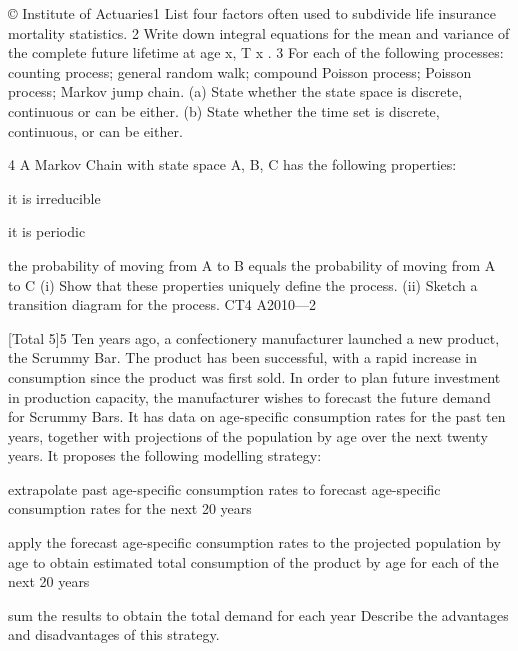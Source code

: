 © Institute of Actuaries1 List four factors often used to subdivide life insurance mortality statistics.  
2 Write down integral equations for the mean and variance of the complete future
lifetime at age x, T x .  
3
For each of the following processes:
counting process;
general random walk;
compound Poisson process;
Poisson process;
Markov jump chain.
(a) State whether the state space is discrete, continuous or can be either.
(b) State whether the time set is discrete, continuous, or can be either.
 
4
A Markov Chain with state space {A, B, C} has the following properties:
\item it is irreducible
\item it is periodic
\item the probability of moving from A to B equals the probability of moving from A
to C
(i) Show that these properties uniquely define the process.
(ii) Sketch a transition diagram for the process.
CT4 A2010—2

 
[Total 5]5
Ten years ago, a confectionery manufacturer launched a new product, the Scrummy
Bar. The product has been successful, with a rapid increase in consumption since the
product was first sold. In order to plan future investment in production capacity, the
manufacturer wishes to forecast the future demand for Scrummy Bars. It has data on
age-specific consumption rates for the past ten years, together with projections of the
population by age over the next twenty years. It proposes the following modelling
strategy:
\item extrapolate past age-specific consumption rates to forecast age-specific
consumption rates for the next 20 years
\item apply the forecast age-specific consumption rates to the projected population by
age to obtain estimated total consumption of the product by age for each of the
next 20 years
\item sum the results to obtain the total demand for each year
Describe the advantages and disadvantages of this strategy.

\newpage

